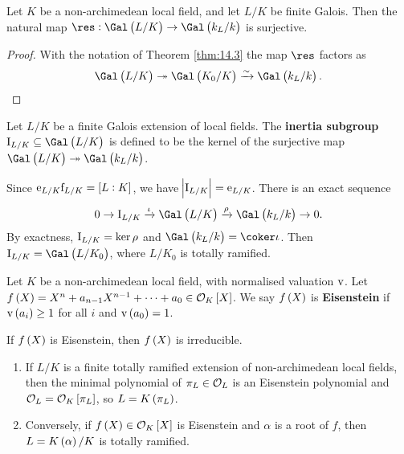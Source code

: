 \begin{corollary}
Let $ K $ be a non-archimedean local field, and let $ L / K $ be finite Galois. Then the natural map $ \res : \Gal\br{L / K} \to \Gal\br{k_L / k} $ is surjective.
\end{corollary}

\begin{proof}
With the notation of Theorem \ref{thm:14.3} the map $ \res $ factors as
$$ \Gal\br{L / K} \twoheadrightarrow \Gal\br{K_0 / K} \xrightarrow{\sim} \Gal\br{k_L / k}. $$
\end{proof}

\begin{definition}
Let $ L / K $ be a finite Galois extension of local fields. The \textbf{inertia subgroup} $ \I_{L / K} \subseteq \Gal\br{L / K} $ is defined to be the kernel of the surjective map $ \Gal\br{L / K} \twoheadrightarrow \Gal\br{k_L / k} $.
\end{definition}

Since $ \e_{L / K}\f_{L / K} = \sbr{L : K} $, we have $ \abs{\mathrm{I}_{L / K}} = \mathrm{e}_{L / K} $. There is an exact sequence
$$ 0 \to \I_{L / K} \xrightarrow{\iota} \Gal\br{L / K} \xrightarrow{\rho} \Gal\br{k_L / k} \to 0. $$
By exactness, $ \mathrm{I}_{L / K} = \ker \rho $ and $ \Gal\br{k_L / k} = \coker \iota $. Then $ \I_{L / K} = \Gal\br{L / K_0} $, where $ L / K_0 $ is totally ramified.

\begin{definition}
Let $ K $ be a non-archimedean local field, with normalised valuation $ \mathrm{v} $. Let $ f\br{X} = X^n + a_{n - 1}X^{n - 1} + \dots + a_0 \in \OOO_K\sbr{X} $. We say $ f\br{X} $ is \textbf{Eisenstein} if $ \v\br{a_i} \ge 1 $ for all $ i $ and $ \v\br{a_0} = 1 $.
\end{definition}

\begin{fact*}
If $ f\br{X} $ is Eisenstein, then $ f\br{X} $ is irreducible.
\end{fact*}

\begin{theorem}
\label{thm:14.8}
\hfill
\begin{enumerate}
\item If $ L / K $ is a finite totally ramified extension of non-archimedean local fields, then the minimal polynomial of $ \pi_L \in \mathcal{O}_L $ is an Eisenstein polynomial and $ \OOO_L = \OOO_K\sbr{\pi_L} $, so $ L = K\br{\pi_L} $.
\item Conversely, if $ f\br{X} \in \OOO_K\sbr{X} $ is Eisenstein and $ \alpha $ is a root of $ f $, then $ L = K\br{\alpha} / K $ is totally ramified.
\end{enumerate}
\end{theorem}

